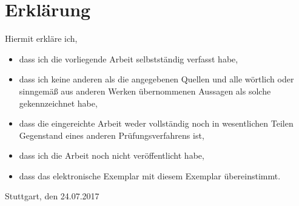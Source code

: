 	\restoregeometry

	\thispagestyle{empty}
	\cleardoublepage

	\chapter*{Erklärung}
	Hiermit erkläre ich,

	\begin{itemize}
		\item dass ich die vorliegende Arbeit selbstständig verfasst habe,
		\item dass ich keine anderen als die angegebenen Quellen und alle wörtlich oder sinngemäß aus anderen Werken übernommenen Aussagen als solche gekennzeichnet habe,
		\item dass die eingereichte Arbeit weder vollständig noch in wesentlichen Teilen Gegenstand eines anderen Prüfungsverfahrens ist,
		\item dass ich die Arbeit noch nicht veröffentlicht habe,
		\item dass das elektronische Exemplar mit diesem Exemplar übereinstimmt.
	\end{itemize}

	\bigskip

	Stuttgart, den 24.07.2017

	
	

	\clearpage		%
	\tableofcontents
	
	
	
	
	
	
	
	
	
	
	
	
	
	\begin{flushleft}
	
	\end{flushleft}

